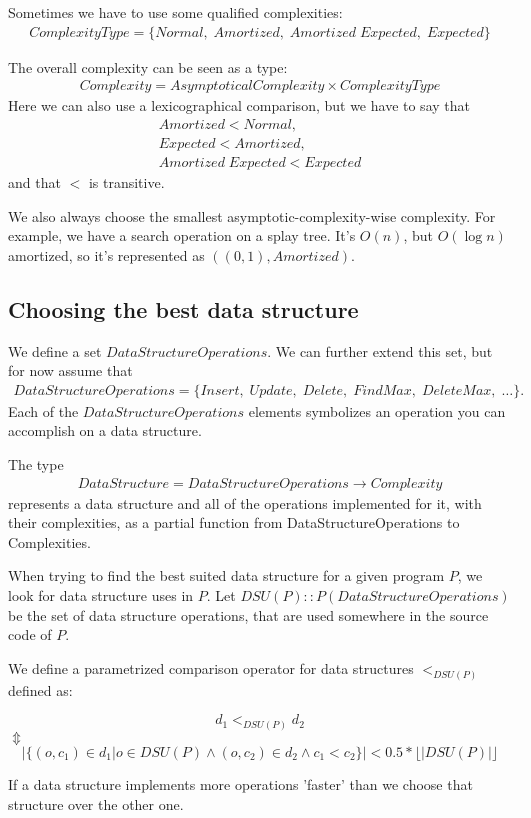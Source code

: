 \documentclass[11pt]{article}
\begin{document}
		Sometimes we have to use some qualified complexities:
		\begin{eqnarray}
			ComplexityType = \{ Normal, \; Amortized, \; Amortized \;Expected, \; Expected \}
		\end{eqnarray}

		The overall complexity can be seen as a type:
		\begin{eqnarray}
			Complexity = AsymptoticalComplexity \times ComplexityType
		\end{eqnarray}
		Here we can also use a lexicographical comparison, but we have to say that
		\begin{eqnarray}
			Amortized < Normal,\\
			Expected < Amortized,\\
			Amortized \; Expected < Expected
		\end{eqnarray}
		and that $<$ is transitive.

		We also always choose the smallest asymptotic-complexity-wise complexity.
		For example, we have a search operation on a splay tree. It's $O(n)$, but $O(\log n)$ amortized,
		so it's represented as $((0,1),Amortized)$.
	\subsection{Choosing the best data structure}
		We define a set $DataStructureOperations$. We can further extend this set, but for now assume that
		\begin{eqnarray}
		  	DataStructureOperations = \{Insert, \; Update, \; Delete, \; FindMax,\; DeleteMax, \; \dots\}.
		\end{eqnarray}
		Each of the $DataStructureOperations$ elements symbolizes an operation you can accomplish on a data structure.

		The type
		\begin{eqnarray}
			DataStructure = DataStructureOperations \rightarrow Complexity
		\end{eqnarray}
		represents a data structure and all of the operations implemented for it,
		with their complexities, as a partial function from DataStructureOperations to Complexities.

		When trying to find the best suited data structure for a given program $P$,
		we look for data structure uses in $P$. Let $DSU(P) :: P(DataStructureOperations)$ be the set
		of data structure operations, that are used somewhere in the source code of $P$.

		We define a parametrized comparison operator for data structures $<_{DSU(P)}$ defined as:
		\begin{center}
			\begin{equation}
				d_1 <_{DSU(P)} d_2
			\end{equation}
				$\Updownarrow$
			\begin{equation}
				|\{(o, c_1) \in d_1 | o \in DSU(P) \wedge (o,c_2) \in d_2 \wedge c_1 < c_2 \}| <
				0.5 * \lfloor |DSU(P)| \rfloor
			\end{equation}
		\end{center}
		If a data structure implements more operations 'faster' than we choose that structure over the other one.
\end{document}
